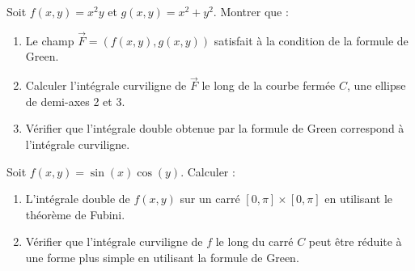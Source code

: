 \begin{exercice}
Soit \( f(x, y) = x^2 y \) et \( g(x, y) = x^2 + y^2 \). Montrer que :
\begin{enumerate}
    \item Le champ \( \vec{F} = (f(x, y), g(x, y)) \) satisfait à la condition de la formule de Green.
    \item Calculer l'intégrale curviligne de \( \vec{F} \) le long de la courbe fermée \( C \), une ellipse de demi-axes 2 et 3.
    \item Vérifier que l'intégrale double obtenue par la formule de Green correspond à l'intégrale curviligne.
\end{enumerate}
\end{exercice}

\begin{exercice}
Soit \( f(x, y) = \sin(x) \cos(y) \). Calculer :
\begin{enumerate}
    \item L'intégrale double de \( f(x, y) \) sur un carré \( [0, \pi] \times [0, \pi] \) en utilisant le théorème de Fubini.
    \item Vérifier que l'intégrale curviligne de \( f \) le long du carré \( C \) peut être réduite à une forme plus simple en utilisant la formule de Green.
\end{enumerate}
\end{exercice}

